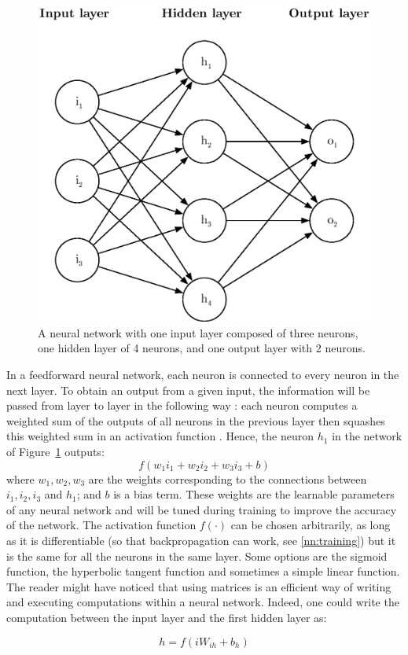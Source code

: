 \begin{figure}[]
	\centering
	\includegraphics[width=0.6\linewidth]{fig/neural_network.eps}
	\caption{A neural network with one input layer composed of three neurons,
	one hidden layer of 4 neurons, and one output layer with 2 neurons.}
	\label{fig:neural_network}
\end{figure}


In a feedforward neural network, each neuron is connected to every neuron in 
the next layer.  To obtain an output from a given input,
the information will be passed from layer to layer in the following way : 
each neuron computes a weighted sum of the outputs of all neurons in the
previous layer then squashes this weighted sum in an activation function
. 
Hence, the neuron $h_1$ in the network of Figure~\ref{fig:neural_network}
outputs:
$$ f(w_1i_1 + w_2i_2 + w_3i_3 + b) $$
where $w_1, w_2, w_3$ are the weights  corresponding to the
connections between $i_1, i_2, i_3$ and $h_1$; and $b$ is a bias term. 
These weights are the learnable parameters of any neural network and will be 
tuned during training to improve the accuracy of the network. 
The activation function $f(\cdot)$ can be chosen arbitrarily, as long as it 
is differentiable (so that backpropagation can work, see \ref{nn:training})
but it is the same for all the neurons in the same layer. Some options are
the sigmoid function, the hyperbolic tangent function and sometimes a simple
linear function.\\

The reader might have noticed that using matrices is an efficient way of writing
and executing computations within a neural network. Indeed, one could write
the computation between the input layer and the first hidden layer as: 

$$ h = f(iW_{ih} + b_h) $$

